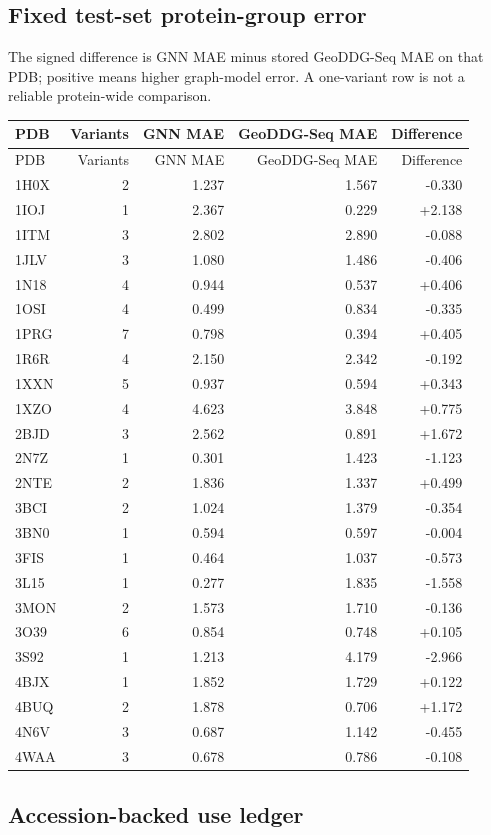 \documentclass[11pt]{article}
\begin{document}
\subsection{Fixed test-set protein-group error}
The signed difference is GNN MAE minus stored GeoDDG-Seq MAE on that PDB; positive means higher graph-model error. A one-variant row is not a reliable protein-wide comparison.
\begin{longtable}{lrrrr}\hline PDB & Variants & GNN MAE & GeoDDG-Seq MAE & Difference\\\hline\endfirsthead\hline PDB & Variants & GNN MAE & GeoDDG-Seq MAE & Difference\\\hline\endhead
1H0X & 2 & 1.237 & 1.567 & -0.330\\
1IOJ & 1 & 2.367 & 0.229 & +2.138\\
1ITM & 3 & 2.802 & 2.890 & -0.088\\
1JLV & 3 & 1.080 & 1.486 & -0.406\\
1N18 & 4 & 0.944 & 0.537 & +0.406\\
1OSI & 4 & 0.499 & 0.834 & -0.335\\
1PRG & 7 & 0.798 & 0.394 & +0.405\\
1R6R & 4 & 2.150 & 2.342 & -0.192\\
1XXN & 5 & 0.937 & 0.594 & +0.343\\
1XZO & 4 & 4.623 & 3.848 & +0.775\\
2BJD & 3 & 2.562 & 0.891 & +1.672\\
2N7Z & 1 & 0.301 & 1.423 & -1.123\\
2NTE & 2 & 1.836 & 1.337 & +0.499\\
3BCI & 2 & 1.024 & 1.379 & -0.354\\
3BN0 & 1 & 0.594 & 0.597 & -0.004\\
3FIS & 1 & 0.464 & 1.037 & -0.573\\
3L15 & 1 & 0.277 & 1.835 & -1.558\\
3MON & 2 & 1.573 & 1.710 & -0.136\\
3O39 & 6 & 0.854 & 0.748 & +0.105\\
3S92 & 1 & 1.213 & 4.179 & -2.966\\
4BJX & 1 & 1.852 & 1.729 & +0.122\\
4BUQ & 2 & 1.878 & 0.706 & +1.172\\
4N6V & 3 & 0.687 & 1.142 & -0.455\\
4WAA & 3 & 0.678 & 0.786 & -0.108\\
\hline\end{longtable}
\clearpage\subsection{Accession-backed use ledger}
\end{document}
